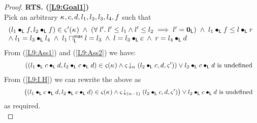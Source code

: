 \begin{lemma}[]
\begin{proof}
\noindent\textbf{RTS. (\ref{L9:Goal1})}\\
Pick an arbitrary $\kappa_{}, c, d, l_1, l_2, l_3, l_4, f$ such that
%
\begin{equation}
\hspace*{-0.15cm}
\begin{array}{l}
	(l_1 \composeL f, l_2 \composeL f) \in \amod{}'(\ca{}) \;\land\; 
	\left(\for{l'} l' \leq l_1 \land l' \leq l_2 \implies l' = \unitL \right)
	\;\land\; l_1 \composeL f \leq l \composeL r\\
%
	\land\; l_1 = l_3 \composeL l_4 \;\land\; 	l_1 \maxMeetL l = l_3 \;\land\; l = l_3 \composeL c \;\land\; r = l_4 \composeL d
\end{array} \label{L9:Ass2}
\end{equation}
%
From (\ref{L9:Ass1}) and (\ref{L9:Ass2}) we have:
%
\begin{align}
	&\hspace*{1cm} \left((l_1 \bullet_{\textsf{L}} c \bullet_{\textsf{L}} d, l_2 \bullet_{\textsf{L}} c \bullet_{\textsf{L}} d) \in \varsigma_{}(\kappa_{}) \land
	\varsigma_{\!}\downarrow_{n} \left(l_2 \bullet_{\textsf{L}} c, d, \varsigma_{}'\right)\right) \lor l_2 \bullet_{\textsf{L}} c \bullet_{\textsf{L}} d \text{ is undefined} \nonumber
\end{align}
%
From (\ref{L9:I.H}) we can rewrite the above as 
%
\begin{align}
	&\hspace*{1cm} \left((l_1 \bullet_{\textsf{L}} c \bullet_{\textsf{L}} d, l_2 \bullet_{\textsf{L}} c \bullet_{\textsf{L}} d) \in \varsigma_{}(\kappa_{}) \land
	\varsigma_{\!}\downarrow_{(n-1)} \left(l_2 \bullet_{\textsf{L}} c, d, \varsigma_{}'\right)\right) \lor l_2 \bullet_{\textsf{L}} c \bullet_{\textsf{L}} d \text{ is undefined} \label{L9:Ass3}
\end{align}
%
as required.\\


\end{proof}
\end{lemma}
